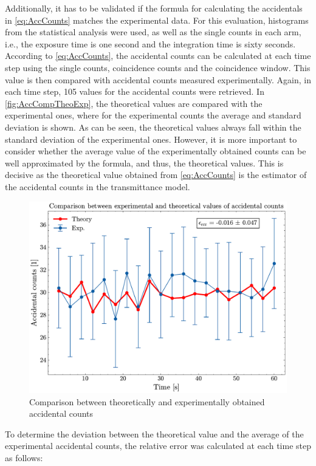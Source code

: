 Additionally, it has to be validated if the formula for calculating the accidentals in \autoref{eq:AccCounts} matches the experimental data. For this evaluation, histograms from the statistical analysis were used, as well as the single counts in each arm, i.e., the exposure time is one second and the integration time is sixty seconds. \newline
According to \autoref{eq:AccCounts}, the accidental counts can be calculated at each time step using the single counts, coincidence counts and the coincidence window. This value is then compared with accidental counts measured experimentally. Again, in each time step, 105 values for the accidental counts were retrieved. In \autoref{fig:AccCompTheoExp}, the theoretical values are compared with the experimental ones, where for the experimental counts the average and standard deviation is shown. \newline
As can be seen, the theoretical values always fall within the standard deviation of the experimental ones. However, it is more important to consider whether the average value of the experimentally obtained counts can be well approximated by the formula, and thus, the theoretical values. This is decisive as the theoretical value obtained from \autoref{eq:AccCounts} is the estimator of the accidental counts in the transmittance model. 
\begin{figure}[tb!]
	\centering
	\includegraphics[width=.7\textwidth]{Images/AccCountsTheoExpRelError.pdf}
	\caption{Comparison between theoretically and experimentally obtained accidental counts}
	\label{fig:AccCompTheoExp}
\end{figure}\newline
To determine the deviation between the theoretical value and the average of the experimental accidental counts, the relative error was calculated at each time step as follows:
